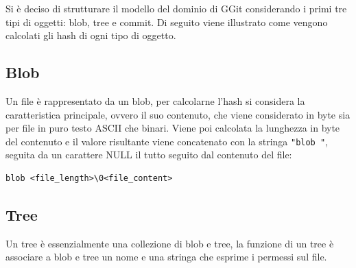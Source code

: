 Si è deciso di strutturare il modello del dominio di GGit considerando i primi tre tipi di oggetti: blob, tree e commit.
Di seguito viene illustrato come vengono calcolati gli hash di ogni tipo di oggetto.

\subsection{Blob}
Un file è rappresentato da un blob, per calcolarne l'hash si considera la caratteristica principale, ovvero il suo contenuto, che viene considerato in byte sia per file in puro testo ASCII che binari.
Viene poi calcolata la lunghezza in byte del contenuto e il valore risultante viene concatenato con la stringa \texttt{"blob "}, seguita da un carattere NULL il tutto seguito dal contenuto del file:
\begin{verbatim}
blob <file_length>\0<file_content>
\end{verbatim}
\subsection{Tree}
Un tree è essenzialmente una collezione di blob e tree, la funzione di un tree è associare a blob e tree un nome e una stringa che esprime i permessi sul file.


